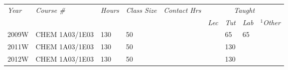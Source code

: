 \documentclass[11pt,notitlepage,english]{report}
\begin{document}
\begin{table}[H]
  \centering
  \begin{tabular}{|l|l|l|l|l|l|l|l|l|}
    \hline
    \multicolumn{1}{|l|}{\multirow{2}{*}{\textit{Year}}} & \multicolumn{1}{l|}{\multirow{2}{*}{\textit{Course \#}}}                                                        & \multicolumn{1}{l|}{\multirow{2}{*}{\textit{Hours}}} & \multicolumn{1}{l|}{\multirow{2}{*}{\textit{Class Size}}} & \multicolumn{1}{l|}{\multirow{2}{*}{\textit{Contact Hrs}}} & \multicolumn{4}{c|}{\textit{Taught}}                                                                                                               \\ \cline{6-9}
    \multicolumn{1}{|l|}{}                               & \multicolumn{1}{l|}{}                                                                                           & \multicolumn{1}{l|}{}                                & \multicolumn{1}{l|}{}                                     & \multicolumn{1}{l|}{}                                      & \multicolumn{1}{l|}{\textit{Lec}}    & \multicolumn{1}{l|}{\textit{Tut}} & \multicolumn{1}{l|}{\textit{Lab}} & \multicolumn{1}{l|}{\textit{$^{1}$Other}} \\ \hline
    2009W                                                & CHEM 1A03/1E03                                                                                                  & 130                                                  & 50                                                        &                                                            &                                      & 65                                & 65                                &                                     \\ \hline
    2011W                                                & CHEM 1A03/1E03                                                                                                  & 130                                                  & 50                                                        &                                                            &                                      & 130                               &                                   &                                     \\ \hline
    2012W                                                & CHEM 1A03/1E03                                                                                                  & 130                                                  & 50                                                        &                                                            &                                      & 130                               &                                   &                                     \\ \hline

\end{tabular}
\end{table}
\end{document}
